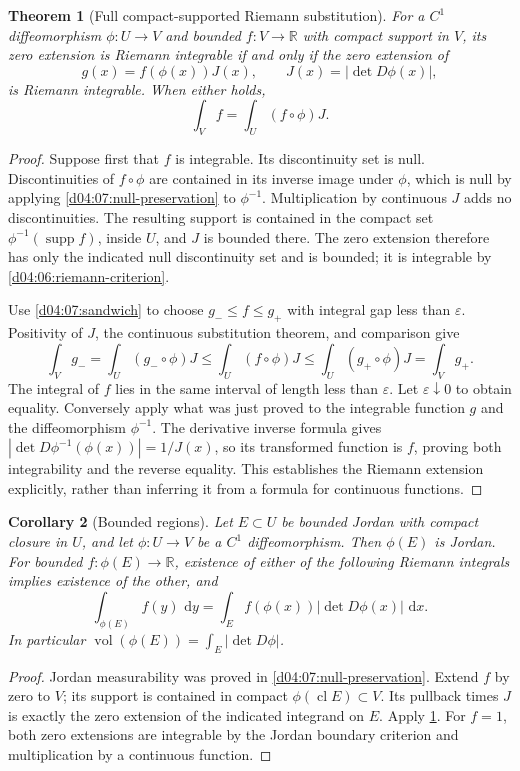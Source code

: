 \documentclass[11pt,oneside,openany]{book}
\newtheorem{theorem}{Theorem}[chapter]
\newtheorem{corollary}[theorem]{Corollary}
\theoremstyle{definition}
\theoremstyle{remark}
\newcommand{\R}{\mathbb R}
\newcommand{\eps}{\varepsilon}
\newcommand{\dd}{\,\mathrm d}
\DeclareMathOperator{\supp}{supp}
\DeclareMathOperator{\vol}{vol}
\DeclareMathOperator{\cl}{cl}
\begin{document}
\begin{theorem}[Full compact-supported Riemann substitution]\label{d04:07:substitution}
For a $C^1$ diffeomorphism $\phi:U\to V$ and bounded $f:V\to\R$ with compact support in $V$, its zero extension is Riemann integrable if and only if the zero extension of
\[
 g(x)=f(\phi(x))J(x),\qquad J(x)=|\det D\phi(x)|,
\]
is Riemann integrable. When either holds,
\[
 \int_Vf=\int_U(f\circ\phi)J.
\]
\end{theorem}
\begin{proof}
Suppose first that $f$ is integrable. Its discontinuity set is null. Discontinuities of $f\circ\phi$ are contained in its inverse image under $\phi$, which is null by applying \cref{d04:07:null-preservation} to $\phi^{-1}$. Multiplication by continuous $J$ adds no discontinuities. The resulting support is contained in the compact set $\phi^{-1}(\supp f)$, inside $U$, and $J$ is bounded there. The zero extension therefore has only the indicated null discontinuity set and is bounded; it is integrable by \cref{d04:06:riemann-criterion}.

Use \cref{d04:07:sandwich} to choose $g_-\leq f\leq g_+$ with integral gap less than $\eps$. Positivity of $J$, the continuous substitution theorem, and comparison give
\[
 \int_Vg_- =\int_U(g_-\circ\phi)J
 \leq \int_U(f\circ\phi)J
 \leq\int_U(g_+\circ\phi)J=\int_Vg_+.
\]
The integral of $f$ lies in the same interval of length less than $\eps$. Let $\eps\downarrow0$ to obtain equality. Conversely apply what was just proved to the integrable function $g$ and the diffeomorphism $\phi^{-1}$. The derivative inverse formula gives $|\det D\phi^{-1}(\phi(x))|=1/J(x)$, so its transformed function is $f$, proving both integrability and the reverse equality. This establishes the Riemann extension explicitly, rather than inferring it from a formula for continuous functions.
\end{proof}

\begin{corollary}[Bounded regions]\label{d04:07:regions}
Let $E\subset U$ be bounded Jordan with compact closure in $U$, and let $\phi:U\to V$ be a $C^1$ diffeomorphism. Then $\phi(E)$ is Jordan. For bounded $f:\phi(E)\to\R$, existence of either of the following Riemann integrals implies existence of the other, and
\[
 \int_{\phi(E)}f(y)\,\dd y=\int_Ef(\phi(x))|\det D\phi(x)|\,\dd x.
\]
In particular $\vol(\phi(E))=\int_E|\det D\phi|$.
\end{corollary}
\begin{proof}
Jordan measurability was proved in \cref{d04:07:null-preservation}. Extend $f$ by zero to $V$; its support is contained in compact $\phi(\cl E)\subset V$. Its pullback times $J$ is exactly the zero extension of the indicated integrand on $E$. Apply \cref{d04:07:substitution}. For $f=1$, both zero extensions are integrable by the Jordan boundary criterion and multiplication by a continuous function.
\end{proof}
\end{document}

